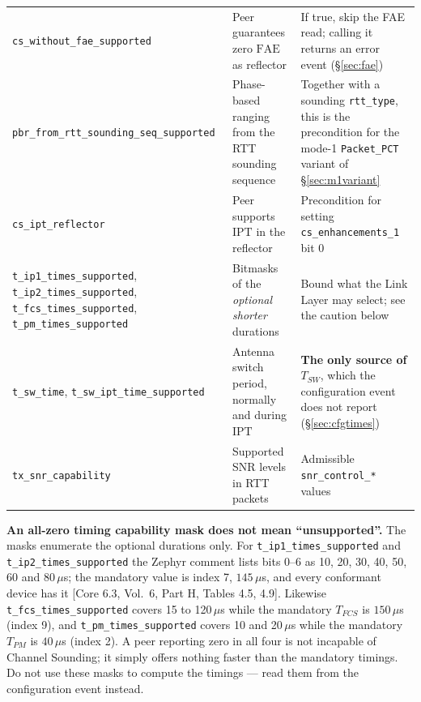 \documentclass[11pt,a4paper]{article}
\newcommand{\us}{\,\ensuremath{\upmu}s}
\newcommand{\code}[1]{\texttt{\small #1}}
\newcommand{\FAE}{\ensuremath{\mathrm{FAE}}}
\newcommand{\IPT}{\ensuremath{\mathrm{IPT}}}
\providecommand{\upmu}{\mu}
\newcommand{\core}[1]{\textcolor{rulegrey}{\small[Core 6.3, #1]}}
\newcommand{\Tpm}{\ensuremath{T_{PM}}}
\newcommand{\Tsw}{\ensuremath{T_{SW}}}
\begin{document}
\begin{table}[htb]
\begin{tabular}{@{}L{44mm}L{42mm}L{48mm}@{}}
\code{cs\_\allowbreak{}without\_\allowbreak{}fae\_\allowbreak{}supported} & Peer guarantees zero $\FAE$ as reflector & If true, skip the FAE read; calling it returns an error event (\S\ref{sec:fae}) \\
\code{pbr\_\allowbreak{}from\_\allowbreak{}rtt\_\allowbreak{}sounding\_\allowbreak{}seq\_\allowbreak{}supported} & Phase-based ranging from the RTT sounding sequence & Together with a sounding \code{rtt\_\allowbreak{}type}, this is the precondition for the mode-1 \code{Packet\_\allowbreak{}PCT} variant of \S\ref{sec:m1variant} \\
\code{cs\_\allowbreak{}ipt\_\allowbreak{}reflector} & Peer supports \IPT{} in the reflector & Precondition for setting \code{cs\_\allowbreak{}enhancements\_\allowbreak{}1} bit 0 \\
\code{t\_\allowbreak{}ip1\_\allowbreak{}times\_\allowbreak{}supported}, \code{t\_\allowbreak{}ip2\_\allowbreak{}times\_\allowbreak{}supported}, \code{t\_\allowbreak{}fcs\_\allowbreak{}times\_\allowbreak{}supported}, \code{t\_\allowbreak{}pm\_\allowbreak{}times\_\allowbreak{}supported} & Bitmasks of the \emph{optional shorter} durations & Bound what the Link Layer may select; see the caution below \\
\code{t\_\allowbreak{}sw\_\allowbreak{}time}, \code{t\_\allowbreak{}sw\_\allowbreak{}ipt\_\allowbreak{}time\_\allowbreak{}supported} & Antenna switch period, normally and during \IPT & \textbf{The only source of \Tsw}, which the configuration event does not report (\S\ref{sec:cfgtimes}) \\
\code{tx\_\allowbreak{}snr\_\allowbreak{}capability} & Supported SNR levels in RTT packets & Admissible \code{snr\_\allowbreak{}control\_\allowbreak{}*} values \\
\bottomrule
\end{tabular}
\end{table}

\begin{caution}
\textbf{An all-zero timing capability mask does not mean ``unsupported''.} The masks enumerate the
optional durations only. For \code{t\_\allowbreak{}ip1\_\allowbreak{}times\_\allowbreak{}supported} and
\code{t\_\allowbreak{}ip2\_\allowbreak{}times\_\allowbreak{}supported} the Zephyr comment lists bits 0--6 as 10, 20, 30, 40, 50, 60
and 80\us; the mandatory value is index 7, $145$\us, and every conformant device has it
\core{Vol.\ 6, Part H, Tables 4.5, 4.9}. Likewise \code{t\_\allowbreak{}fcs\_\allowbreak{}times\_\allowbreak{}supported} covers 15
to 120\us{} while the mandatory $T_{FCS}$ is $150$\us{} (index 9), and
\code{t\_\allowbreak{}pm\_\allowbreak{}times\_\allowbreak{}supported} covers 10 and 20\us{} while the mandatory \Tpm{} is $40$\us{}
(index 2). A peer reporting zero in all four is not incapable of Channel Sounding; it simply offers
nothing faster than the mandatory timings. Do not use these masks to compute the timings ---
read them from the configuration event instead.
\end{caution}
\end{document}
